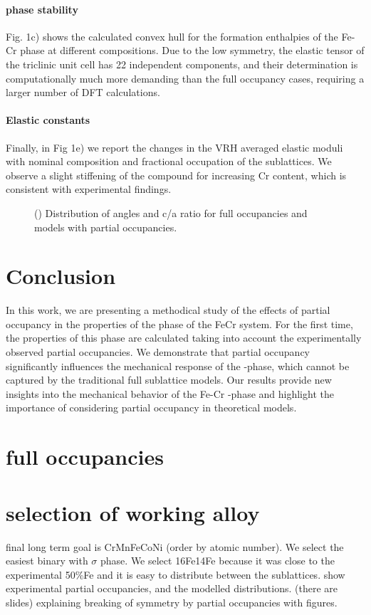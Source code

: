 \documentclass[superscriptaddress, 12pt]{revtex4-2}%
\begin{document}
\paragraph{phase stability}
Fig. 1c) shows the calculated convex hull for the formation enthalpies of the Fe-Cr \textsigma phase at different compositions.
Due to the low symmetry, the elastic tensor of the triclinic unit cell has 22 independent components, and their determination is computationally much more demanding than the full occupancy cases, requiring a larger number of DFT calculations.

\paragraph{Elastic constants}
Finally, in Fig 1e) we report the changes in the VRH averaged elastic moduli with nominal composition and fractional occupation of the sublattices.
We observe a slight stiffening of the compound for increasing Cr content, which is consistent with experimental findings.

\begin{figure}
  \caption{\protect\label{fig:SymmetryConsiderations}
    () 
    Distribution of angles and c/a ratio for full occupancies and models with partial occupancies. 
  }
\end{figure}
\section{Conclusion}
In this work, we are presenting a methodical study of the effects of partial occupancy in the properties of the \textsigma phase of the FeCr system.
For the first time, the properties of this phase are calculated taking into account the experimentally observed partial occupancies.
We demonstrate that partial occupancy significantly influences the mechanical response of the \textsigma-phase, which cannot be captured by the traditional full sublattice models.
Our results provide new insights into the mechanical behavior of the Fe-Cr \textsigma-phase and highlight the importance of considering partial occupancy in theoretical models.


\section{full occupancies}

\section{selection of working alloy}
final long term goal is CrMnFeCoNi (order by atomic number).
We select the easiest binary with $\sigma$ phase.
We select 16Fe14Fe because it was close to the experimental 50\%Fe and it is easy to distribute between the sublattices.
show experimental partial occupancies, and the modelled distributions.
(there are slides)
explaining breaking of symmetry by partial occupancies with figures.


 
\end{document}

